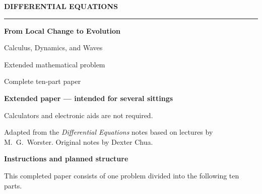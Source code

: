 \documentclass[10pt,a4paper]{article}
\begin{document}

\begin{titlepage}
  \thispagestyle{empty}
  \begin{center}
    \vspace*{1.3cm}
    {\Large\bfseries DIFFERENTIAL EQUATIONS\par}
    \vspace{0.35cm}
    \rule{0.72\textwidth}{0.6pt}
    \vspace{0.65cm}

    {\huge\bfseries From Local Change to Evolution\par}
    \vspace{0.2cm}
    {\Large Calculus, Dynamics, and Waves\par}

    \vfill

    {\Large Extended mathematical problem\par}
    \vspace{0.3cm}
    {\large Complete ten-part paper\par}

    \vfill

    \begin{minipage}{0.72\textwidth}
      \centering
      \textbf{Extended paper --- intended for several sittings}\par
      \vspace{0.25cm}
      Calculators and electronic aids are not required.
    \end{minipage}

    \vfill

    \begin{minipage}{0.82\textwidth}
      \centering\small
      Adapted from the \emph{Differential Equations} notes based on lectures
      by M.\ G.\ Worster. Original notes by Dexter Chua.
    \end{minipage}
    \vspace*{0.8cm}
  \end{center}
\end{titlepage}


\begin{center}
  {\large\bfseries Instructions and planned structure}
\end{center}

This completed paper consists of one problem divided into the following ten
parts.
\end{document}
